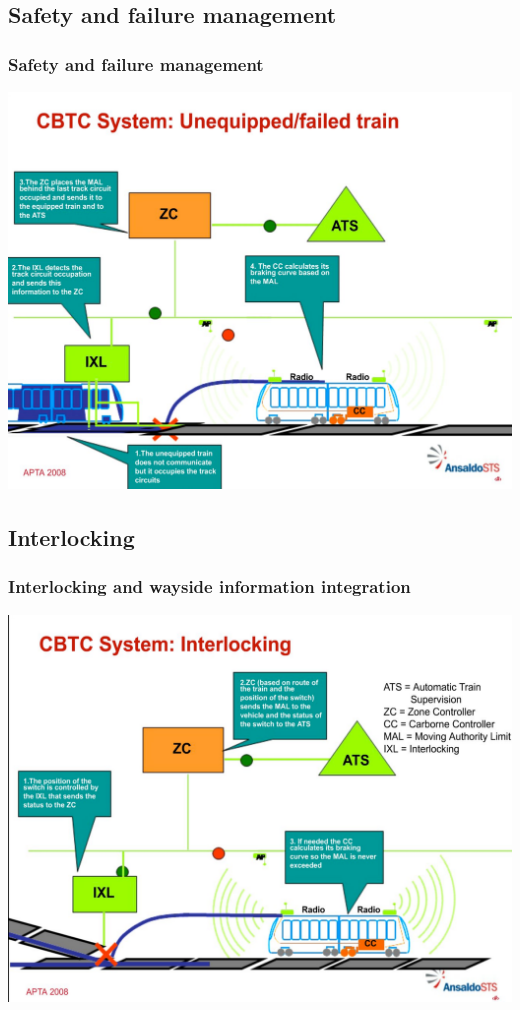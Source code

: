 \subsection{Safety and failure management}
\frame
{
\frametitle{Safety and failure management}
 \begin{center}
	\includegraphics[scale=0.20]{./fig/AnsaldoUnequiped}
      \end{center} 


}

\subsection{Interlocking}
\frame
{
\frametitle{Interlocking and wayside information integration}



 \begin{center}
	\includegraphics[scale=0.20]{./fig/AnsaldoInterloking}
      \end{center} 


  }

